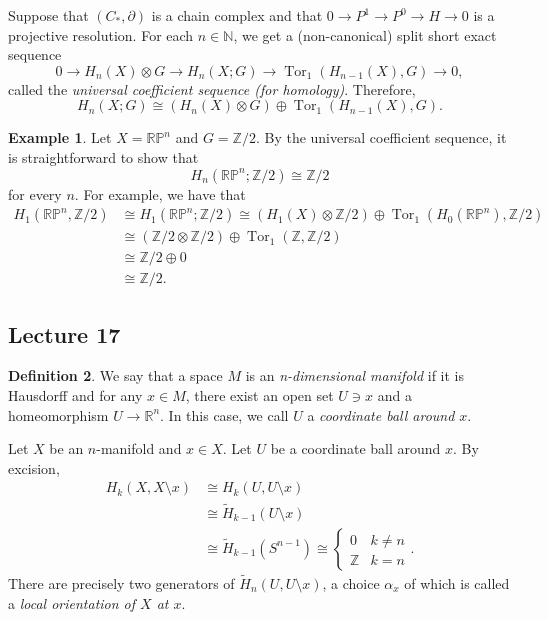 \documentclass[10pt,letterpaper,cm]{nupset}
\theoremstyle{definition}
\newtheorem{definition}{Definition}[subsection]
\newtheorem{exmp}[definition]{Example}
\theoremstyle{theorem}
\theoremstyle{remark}
\newcommand{\N}{\mathbb N}
\newcommand{\R}{\mathbb{R}}
\newcommand{\RP}{\mathbb{RP}}
\newcommand{\Z}{\mathbb Z}
\newcommand{\1}{\mathbb{1}}
\newcommand{\0}{\vec 0}
\DeclareMathOperator{\tor}{Tor}
\begin{document}
\smallskip

Suppose that $\left(C_{\ast}, \partial\right)$ is a chain complex and that $0 \to P^1 \to P^0 \to H \to 0$ is a projective resolution. For each $n\in \N$, we get a (non-canonical) split short exact sequence $$0 \to H_n(X) \otimes G \to H_n(X; G) \to \tor_1(H_{n-1}(X), G) \to 0    ,$$ called the \textit{universal coefficient sequence (for homology)}. Therefore, $$H_n(X; G) \cong (H_n(X) \otimes G)  \oplus  \tor_1(H_{n-1}(X), G).$$


\begin{exmp}
Let $X= \RP^n$ and $G= \Z/2$. By the universal coefficient sequence, it is straightforward to show that $$H_n(\RP^n; \Z/2) \cong \Z/2 $$ for every $n$. For example, we have that
\begin{align*}
H_1(\RP^n, \Z/2) & \cong H_1(\RP^n; \Z/2) \cong (H_1(X) \otimes \Z/2)  \oplus  \tor_1(H_0(\RP^n), \Z/2)
\\ & \cong (\Z/2 \otimes \Z/2)  \oplus  \tor_1(\Z, \Z/2)
\\ & \cong \Z/2 \oplus 0
\\ & \cong \Z/2.
\end{align*}
\end{exmp}

\subsection{Lecture 17}

\begin{definition}
We say that a space $M$ is an \textit{n-dimensional manifold} if it is Hausdorff and for any $x\in M$, there exist an open set $U \ni x$ and a homeomorphism $U \to \R^n$. In this case, we call $U$ a \textit{coordinate ball around $x$}.
\end{definition}


Let $X$ be an $n$-manifold and $x\in X$. Let $U$ be a coordinate ball around $x$. By excision,
\begin{align*} 
 {H}_k(X, X \setminus x) & \cong {H}_k(U, U \setminus x)  \\ &   \cong \widetilde{H}_{k-1}(U\setminus x) \\ & \cong  \widetilde{H}_{k-1}(S^{n-1})  \cong \begin{cases} 0 & k \ne n \\ \Z & k =n \end{cases}.\end{align*} There are precisely two generators of  $\widetilde{H}_n(U, U \setminus x)$, a choice $\alpha_x$ of which is called a \textit{local orientation of $X$ at $x$}.
\end{document}
